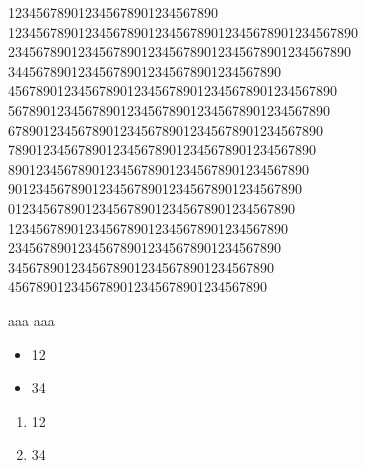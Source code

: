 \begin{frame}{123456789012345678901234567890}
12345678901234567890123456789012345678901234567890
2345678901234567890123456789012345678901234567890
344567890123456789012345678901234567890
45678901234567890123456789012345678901234567890
5678901234567890123456789012345678901234567890
678901234567890123456789012345678901234567890
78901234567890123456789012345678901234567890
8901234567890123456789012345678901234567890
901234567890123456789012345678901234567890
01234567890123456789012345678901234567890
1234567890123456789012345678901234567890
234567890123456789012345678901234567890
34567890123456789012345678901234567890
4567890123456789012345678901234567890
\end{frame}

\begin{frame}
\begin{block}{aaa}
aaa
\end{block}

\begin{itemize}
\item 12
\item 34
\end{itemize}
\begin{enumerate}
\item 12
\item 34
\end{enumerate}
\end{frame}

\begin{frame}{}

\end{frame}

